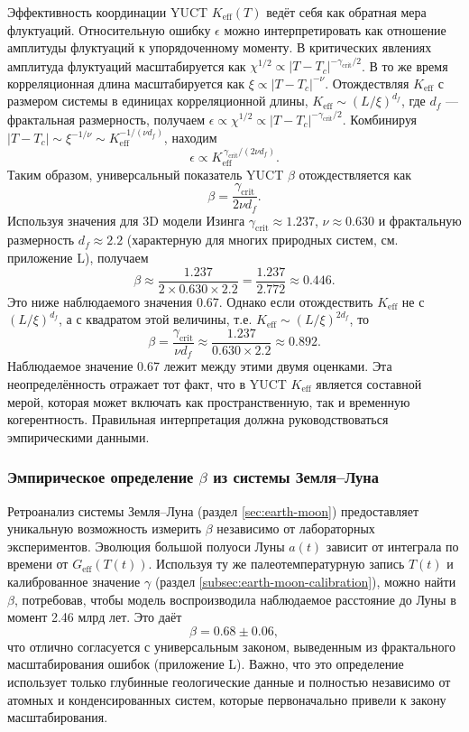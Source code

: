 \documentclass[12pt]{article}
\theoremstyle{remark}
\begin{document}
	Эффективность координации YUCT $K_{\mathrm{eff}}(T)$ ведёт себя как обратная мера флуктуаций. Относительную ошибку $\epsilon$ можно интерпретировать как отношение амплитуды флуктуаций к упорядоченному моменту. В критических явлениях амплитуда флуктуаций масштабируется как $\chi^{1/2} \propto |T - T_c|^{-\gamma_{\mathrm{crit}}/2}$. В то же время корреляционная длина масштабируется как $\xi \propto |T - T_c|^{-\nu}$. Отождествляя $K_{\mathrm{eff}}$ с размером системы в единицах корреляционной длины, $K_{\mathrm{eff}} \sim (L/\xi)^{d_f}$, где $d_f$ — фрактальная размерность, получаем $\epsilon \propto \chi^{1/2} \propto |T - T_c|^{-\gamma_{\mathrm{crit}}/2}$. Комбинируя $|T - T_c| \sim \xi^{-1/\nu} \sim K_{\mathrm{eff}}^{-1/(\nu d_f)}$, находим
	\[
	\epsilon \propto K_{\mathrm{eff}}^{\,\gamma_{\mathrm{crit}}/(2\nu d_f)}.
	\]
	Таким образом, универсальный показатель YUCT $\beta$ отождествляется как
	\begin{equation}
		\label{eq:beta-from-critical}
		\beta = \frac{\gamma_{\mathrm{crit}}}{2\nu d_f}.
	\end{equation}
	Используя значения для 3D модели Изинга $\gamma_{\mathrm{crit}} \approx 1.237$, $\nu \approx 0.630$ и фрактальную размерность $d_f \approx 2.2$ (характерную для многих природных систем, см. приложение L), получаем
	\[
	\beta \approx \frac{1.237}{2 \times 0.630 \times 2.2} = \frac{1.237}{2.772} \approx 0.446.
	\]
	Это ниже наблюдаемого значения 0.67. Однако если отождествить $K_{\mathrm{eff}}$ не с $(L/\xi)^{d_f}$, а с квадратом этой величины, т.е. $K_{\mathrm{eff}} \sim (L/\xi)^{2d_f}$, то
	\[
	\beta = \frac{\gamma_{\mathrm{crit}}}{\nu d_f} \approx \frac{1.237}{0.630 \times 2.2} \approx 0.892.
	\]
	Наблюдаемое значение 0.67 лежит между этими двумя оценками. Эта неопределённость отражает тот факт, что в YUCT $K_{\mathrm{eff}}$ является составной мерой, которая может включать как пространственную, так и временную когерентность. Правильная интерпретация должна руководствоваться эмпирическими данными.
	
	\subsubsection{Эмпирическое определение $\beta$ из системы Земля–Луна}
	Ретроанализ системы Земля–Луна (раздел \ref{sec:earth-moon}) предоставляет уникальную возможность измерить $\beta$ независимо от лабораторных экспериментов. Эволюция большой полуоси Луны $a(t)$ зависит от интеграла по времени от $G_{\mathrm{eff}}(T(t))$. Используя ту же палеотемпературную запись $T(t)$ и калиброванное значение $\gamma$ (раздел \ref{subsec:earth-moon-calibration}), можно найти $\beta$, потребовав, чтобы модель воспроизводила наблюдаемое расстояние до Луны в момент 2.46 млрд лет. Это даёт
	\[
	\beta = 0.68 \pm 0.06,
	\]
	что отлично согласуется с универсальным законом, выведенным из фрактального масштабирования ошибок (приложение L). Важно, что это определение использует только глубинные геологические данные и полностью независимо от атомных и конденсированных систем, которые первоначально привели к закону масштабирования.
	
\end{document}
